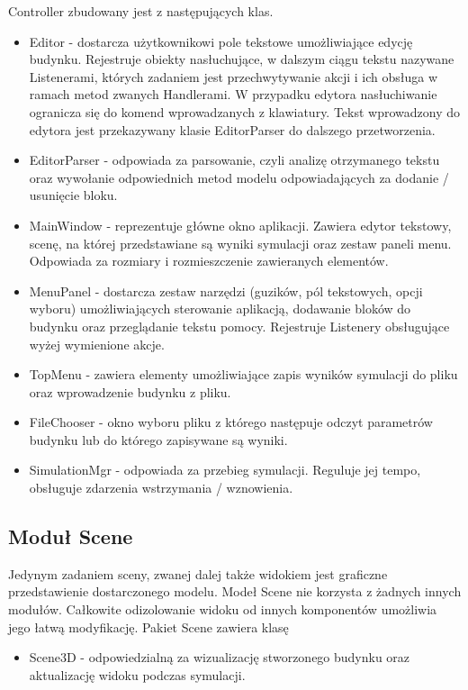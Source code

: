 Controller zbudowany jest z następujących klas.
\begin{itemize}
\item Editor - dostarcza użytkownikowi pole tekstowe umożliwiające edycję budynku. Rejestruje obiekty nasłuchujące, w dalszym ciągu tekstu nazywane Listenerami, których zadaniem jest przechwytywanie akcji i ich obsługa w ramach metod zwanych Handlerami. W przypadku edytora nasłuchiwanie ogranicza się do komend wprowadzanych z klawiatury. Tekst wprowadzony do edytora jest przekazywany klasie EditorParser do dalszego przetworzenia.
\item EditorParser - odpowiada za parsowanie, czyli analizę otrzymanego tekstu oraz wywołanie odpowiednich metod modelu odpowiadających za 
dodanie / usunięcie bloku.
\item MainWindow - reprezentuje główne okno aplikacji. Zawiera edytor tekstowy, scenę, na której przedstawiane są wyniki symulacji oraz 
zestaw paneli menu. Odpowiada za rozmiary i rozmieszczenie zawieranych elementów.
\item MenuPanel - dostarcza zestaw narzędzi (guzików, pól tekstowych, opcji wyboru) umożliwiających sterowanie aplikacją, dodawanie bloków do budynku oraz przeglądanie tekstu pomocy. Rejestruje Listenery obsługujące wyżej wymienione akcje.
\item TopMenu - zawiera elementy umożliwiające zapis wyników symulacji do pliku oraz wprowadzenie budynku z pliku.
\item FileChooser - okno wyboru pliku z którego następuje odczyt parametrów budynku lub do którego zapisywane są wyniki.
\item SimulationMgr - odpowiada za przebieg symulacji. Reguluje jej tempo, obsługuje zdarzenia wstrzymania / wznowienia.
\end {itemize}

\subsection {Moduł Scene}
Jedynym zadaniem sceny, zwanej dalej także widokiem jest graficzne przedstawienie dostarczonego modelu.
Modeł Scene nie korzysta z żadnych innych modułów.
Całkowite odizolowanie widoku od innych komponentów umożliwia jego łatwą modyfikację. Pakiet Scene zawiera klasę
\begin {itemize}
\item Scene3D - odpowiedzialną za wizualizację stworzonego budynku oraz aktualizację widoku podczas symulacji.
\end {itemize}
